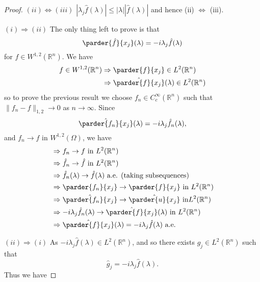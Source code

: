 \documentclass[10pt, oneside, reqno]{amsart}
\theoremstyle{plain}%
\numberwithin{equation}{section}
\theoremstyle{definition}
\theoremstyle{remark}
\newcommand{\R}{\mathbb{R}}
\begin{document}
\begin{proof}
    $(ii) \iff (iii)$ $|\lambda_j \hat f(\lambda) | \leq |\lambda | | \hat f(\lambda)|$ and hence (ii) $\iff$ (iii).  
    
    $(i) \Rightarrow (ii)$  The only thing left to prove is that \[
        \parder{\hat f}{x_j}(\lambda) = -i \lambda_j \hat f(\lambda) 
    \] for $f \in W^{1, 2}(\R^n)$.  We have \begin{align*}
        f \in W^{1, 2}(\R^n) &\Rightarrow \parder{f}{x_j} \in L^2(\R^n) \\
            &\Rightarrow \hat{\parder{f}{x_j}}(\lambda) \in L^2(\R^n)
    \end{align*} so to prove the previous result we choose $f_n \in C^\infty_c(\R^n)$ such that $\| f_n - f\|_{1, 2} \rightarrow 0$ as $n \rightarrow \infty$.  Since \[
        \hat{\parder{f_n}{x_j}}(\lambda) = -i \lambda_j \hat f_n (\lambda),
    \] and $f_n \rightarrow f$ in $W^{1, 2}(\Omega)$, we have \begin{align*}
        &\Rightarrow f_n \rightarrow f \text{ in } L^2(\R^n) \\
        &\Rightarrow \hat f_n \rightarrow \hat f \text{ in } L^2(\R^n) \\
        &\Rightarrow \hat f_n(\lambda) \rightarrow \hat f(\lambda) \text{ a.e. (taking subsequences)} \\
        &\Rightarrow \parder{f_n}{x_j} \rightarrow \parder{f}{x_j} \text{ in } L^2(\R^n) \\
        &\Rightarrow \hat{\parder{f_n}{x_j}} \rightarrow \hat{\parder{u}{x_j}} \text{ in} L^2(\R^n) \\
        &\Rightarrow -i \lambda_j \hat f_n(\lambda) \rightarrow \hat{\parder{f}{x_j}}(\lambda) \text{ in } L^2(\R^n) \\
        &\Rightarrow \hat{\parder{f}{x_j}}(\lambda) = -i \lambda_j \hat f(\lambda) \text{ a.e.}
    \end{align*} 
    
    $(ii) \Rightarrow (i)$ As $-i \lambda_j \hat f(\lambda) \in L^2(\R^n)$, and so there exists $g_j \in L^2(\R^n)$ such that \[
        \hat g_j = -i \lambda_j \hat f(\lambda).
    \]  Thus we have 
    

\end{proof}
\end{document}
